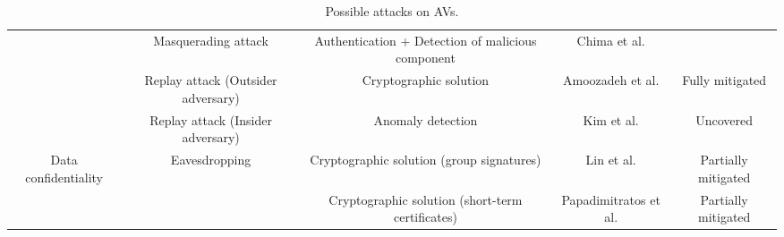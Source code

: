 \begin{table*}[t]
\begin{tabular}{*{5}{c}}
    & Masquerading attack & Authentication + Detection of malicious component & Chima et al. & \\
    
    & Replay attack (Outsider adversary) & Cryptographic solution & Amoozadeh et al. & Fully mitigated\\
    
    & Replay attack (Insider adversary) & Anomaly detection & Kim et al. & Uncovered \\
    
    \hline
    
    Data confidentiality & Eavesdropping & Cryptographic solution (group signatures) & Lin et al. & Partially mitigated \\
    
    & & Cryptographic solution (short-term certificates) & Papadimitratos et al. & Partially mitigated \\
    
    \hline
  \end{tabular}
  \caption{Possible attacks on AVs.}
\end{table*}
